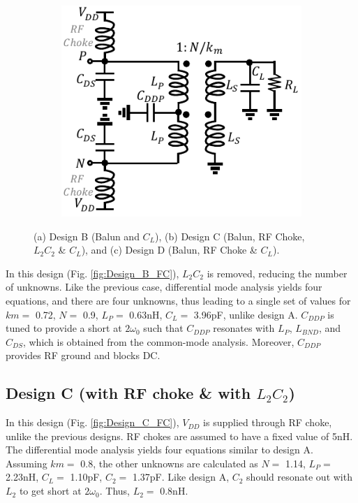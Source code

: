 \documentclass[conference]{IEEEtran}
\begin{document}
\begin{figure}[!t]
\begin{subfigure}{0.24\textwidth}
\includegraphics[width=1\textwidth]{Images/Design/Design_D_FC.pdf}
\caption{}
\label{fig:Design_D_FC}
\end{subfigure}
\caption{(a) Design B (Balun and $C_L$), (b) Design C (Balun, RF Choke, $L_2C_2$ \& $C_L$), and (c) Design D (Balun, RF Choke \& $C_L$).}
\label{fig:Design_B_C_D}
\vspace{-0.25in}
\end{figure}

In this design (Fig. \ref{fig:Design_B_FC}), $L_2C_2$ is removed, reducing the number of unknowns. Like the previous case, differential mode analysis yields four equations, and there are four unknowns, thus leading to a single set of values for $km =$ 0.72, $N =$ 0.9, $L_P =$ 0.63nH, $C_L =$ 3.96pF, unlike design A. $C_{DDP}$ is tuned to provide a short at $2\omega_0$ such that $C_{DDP}$ resonates with $L_P$, $L_{BND}$, and $C_{DS}$, which is obtained from the common-mode analysis. Moreover, $C_{DDP}$ provides RF ground and blocks DC.

\subsection{Design C (with RF choke \& with $L_2C_2$)}
In this design (Fig. \ref{fig:Design_C_FC}), $V_{DD}$ is supplied through RF choke, unlike the previous designs. RF chokes are assumed to have a fixed value of 5nH. The differential mode analysis yields four equations similar to design A. Assuming $km =$ 0.8, the other unknowns are calculated as $N =$ 1.14, $L_P =$ 2.23nH, $C_L =$ 1.10pF, $C_2 =$ 1.37pF.
Like design A, $C_2$ should resonate out with $L_2$ to get short at $2\omega_0$. Thus, $L_2 =$ 0.8nH. 
\end{document}
